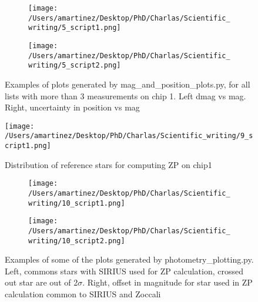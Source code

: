 \documentclass[4paper,11pt]{report}
\begin{document}
\begin{figure}
\begin{subfigure}[b]{0.49\textwidth}
	\texttt{[image: /Users/amartinez/Desktop/PhD/Charlas/Scientific\_writing/5\_script1.png]}
\end{subfigure}
\begin{subfigure}[b]{0.49\textwidth}
	\texttt{[image: /Users/amartinez/Desktop/PhD/Charlas/Scientific\_writing/5\_script2.png]}
\end{subfigure}
\captionsetup{justification=centering}
\caption{Examples of plots generated by mag\_and\_position\_plots.py, for all lists with more than 3 measurements  on chip 1. Left dmag vs mag. Right, uncertainty in position vs mag }
\label{fig3:5_script}
\end{figure}


\begin{figure}
	\begin{center}
		\texttt{[image: /Users/amartinez/Desktop/PhD/Charlas/Scientific\_writing/9\_script1.png]}
		\caption{Distribution of reference stars for computing ZP on chip1}
		\label{fig6:9_script1}
	\end{center}
\end{figure}

\begin{figure}
	\begin{subfigure}[b]{0.49\textwidth}
		\texttt{[image: /Users/amartinez/Desktop/PhD/Charlas/Scientific\_writing/10\_script1.png]}
	\end{subfigure}
	\begin{subfigure}[b]{0.49\textwidth}
		\texttt{[image: /Users/amartinez/Desktop/PhD/Charlas/Scientific\_writing/10\_script2.png]}
	\end{subfigure}
	\captionsetup{justification=centering}
	\caption{Examples of some of the plots generated by photometry\_plotting.py. Left, commons stars with SIRIUS used for ZP calculation, crossed out star are out of 2$\sigma$. Right, offset in magnitude for star used in ZP calculation common to SIRIUS and Zoccali }
	\label{fig7:10_script}
\end{figure}
\end{document}
